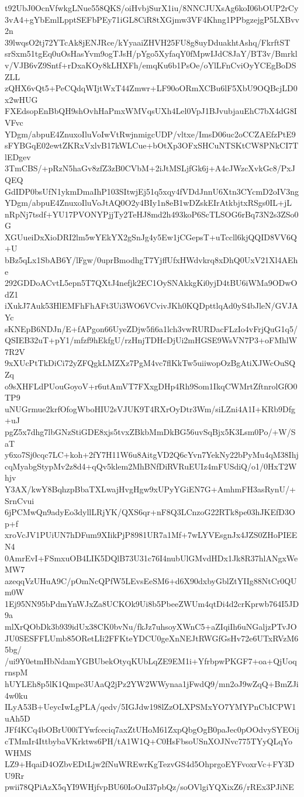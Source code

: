 t92UbJ0OcnVfwkgLNue558QKS/oiHvbjSurX1iu/8NNCJUXsAg6koI06bOUP2rCy
3vA4+gYbEmlLpptSEFbPEy71iGL8CiR8tXGjmw3VF4Khng1PPbgzejgP5LXBvv2n
39lwqsO2tj72YTcAk8jENJRce/kYyaaiZHVH25FU8g8uyDduakhtAshq/FkrftST
srSxm51tgEq0uOsHasYvm9ogTJsH/pYgo5XyfaqY0fMpwIJdC8JaY/BT3v/Bmrkl
v/VJB6vZ9Sntf+rDxaKOy8kLHXFh/emqKu6b1PsOe/oYlLFnCviOyYCEgBoDSZLL
zQHX6vQt5+PeCQdqWIjtWxT44Zmwr+LF90oORmXCBu6lF5XbU9OQBcjLD0x2wHUG
FXEdsopEnBbQH9shOvhHaPmxWMVqsUXh4Lel0VpJ1BJvubjauEhC7bX4dG8IVFvc
YDgm/abpuE4ZnuxoIluVoIwVtRwjnmigcUDP/vltxe/ImsD06uc2oCCZAEfzPtE9
sFYBGqE02ewtZKRxVxlvB17kWLCue+bOtXp3OFxSHCuNTSKtCW8PNkCI7TlEDgev
3TmCBS/+pRzN5haGv8zfZ3zB0CVbM+2iJtMSLjfGk6j+A4cJWzcXvkGc8/PxJQEQ
GdIDP0bsUfN1ykmDmaIhP103SItwjEj51q5xqy4fVDdJnnU6Xtn3CYcmD2oIV3ng
YDgm/abpuE4ZnuxoIluVoJtAQ0O2y4BIy1n8eB1wDZskEIrAtkbjtxRSgs0IL+jL
nRpNj7tsdf+YU17PVONYPjjTy2TeHJ8md2h493koP6ScTLSOG6rBq73N2s3ZSo0G
XGUueiDxXioDRI2lm5wYEkYX2gSnJg4y5Ew1jCGepsT+uTccll6kjQQID8VV6Q+U
bBz5qLx1SbAB6Y/lFgw/0uprBmodhgT7YjffUfxHWdvkrq8xDhQ0UxV21Xl4AEhe
292GDDoACvtL5epn5T7QXtJ4nefjk2EC1OySNAkkgKi0yjD4tBU6iWMa9ODwOdZ1
iXukJ7Auk53HlEMFhFhAFt3Ui3WO6VCvivJKh0KQDpttlqAd0yS4bJleN/GVJAYc
sKNEpB6NDJn/E+fAPgon66UyeZDjw5fi6a1lch3vwRURDacFLzIo4vFrjQuG1q5/
QSIEB32uT+pY1/mfzf9hEkfgU/rzHnjTDHcDjUi2mHGSE9WsVN7P3+oFMhlW7R2V
9xXUcPtTkDiCi72yZFQgkLMZXz7PgM4vc7flKkTw5uiiwopOzBgAtiXJWcOuSQZq
o9sXHFLdPUouGoyoV+r6utAmVT7FXxgDHp4Rh9Som1IkqCWMrtZftnrolGfO0TP9
uNUGrmue2krfOfogWboHIU2sVJUK9T4RXrOyDtr3Wm/siLZni4A1I+KRb9Dfg+uJ
pgZ5x7dhg7lbGNzStiGDE8xjs5tvxZBkbMmDkBG56uvSqBjx5K3Lsm0Po/+W/SaT
y6xo7Sj0cqc7LC+koh+2fY7H11W6u8AitgVD2Q6cYvn7YekNy22bPyMu4qM38Ihj
cqMyabgStypMv2z8d4+qQv5klem2MhBNfDiRVRuEUIz4mFUSdiQ/o1/0HxT2Whjv
Y3AX/kwY8BqhzpBbaTXLwajHvgHgw9xUPyYGiEN7G+AmhmFH3asRynU/+SrnCvui
6jPCMwQn9adyEo3dyllLRjYK/QXS6qr+nF8Q3LCnzoG22RTk8pe03hJKEfD3Op+f
xroVcJV1PUiUN7hDFum9XIikPjP8981UR7a1Mf+7wLYVEsgnJx4JZS0ZHoPIEEN4
0AmrEvI+FSmxuOB4LIK5DQlB73U31c76I4nubUlGMvdHDx1Jk8R37hlANgxWeMW7
azeqqVzUHuA9C/pOmNcQPfW5LEvsEeSM6+d6X90dxbyGblZtYIIg88NtCr0QUm0W
1Ej95NN95bPdmYnWJxZa8UCKOk9Ui8b5PbeeZWUm4qtDi4d2crKprwb764I5JD9a
mlXrQObDk3b939idUx38CK0bvNu/fkJz7uhsoyXWnC5+aZIqiIh6uNGaljzPTvJO
JU0SESFFLUmb85ORetLIi2FFKteYDCU0geXnNEJtRWGfGsHv72e6UTxRVzM65bg/
/ui9Y0etmHbNdamYGBUbekOtyqKUbLqZE9EM1i+YfrbpwPKGF7+oa+QjUoqrnspM
hUYLEh8p5lK1Qmpe3UAaQ2jPz2YW2WWynaa1jFwdQ9/mn2oJ9wZqQ+BmZJi4w0ku
ILyA53B+UeycIwLgPLA/qedv/5IGJdw198lZzOLXPSMxYO7YMYPnCbICPW1uAh5D
JFf4KCq4bOBrU00iTYwfceciq7axZtUHoM61ZxpQbgOgB0paJec0pOOdvySYEOij
cTMmIr4IttbybaVKrktws6PH/tA1W1Q+C0HsFbsoUSnXOJNvc775TYyQLqYoWHMS
LZ9+HqaiD4OZbvEDtLjw2fNuWREwrKgTezvGS4d5OhprgoEYFvoxrVc+FY3DU9Rr
pwii78QPiAzX5qYI9WHjfvpBU60IoOuI37pbQz/soOVlgiYQXixZ6/rREx3PJiNE
